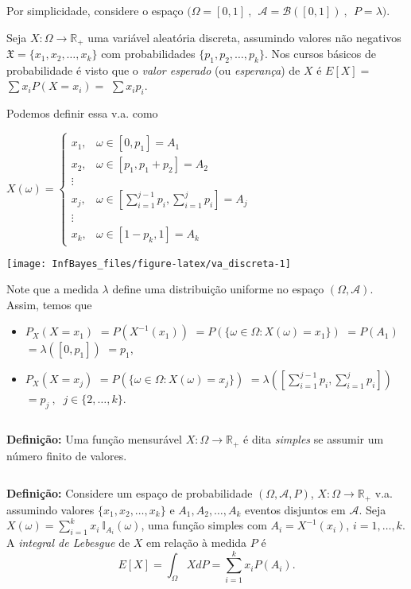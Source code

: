 \documentclass[
]{book}
\begin{document}
Por simplicidade, considere o espaço \(\Big(\Omega = [0,1]~,~~ \mathcal{A} = \mathcal{B}\left([0,1]\right)~,~~ P=\lambda\Big)\).

Seja \(X: \Omega \longrightarrow \mathbb{R}_+\) uma variável aleatória discreta, assumindo valores não negativos \(\mathfrak{X}=\{x_1,x_2,\ldots,x_k\}\) com probabilidades \(\{p_1,p_2,\ldots,p_k\}\). Nos cursos básicos de probabilidade é visto que o \emph{valor esperado} (ou \emph{esperança}) de \(X\) é \(E[X] =\) \(\sum x_i P(X=x_i) =\) \(\sum x_i p_i\).

Podemos definir essa v.a. como

\(X(\omega) = \left\{\begin{array}{ll} x_1, & \omega \in [0,p_1] = A_1 \\  x_2, & \omega \in [p_1,p_1+p_2] = A_2 \\  \vdots & \\  x_j, & \omega \in \left[\displaystyle\sum_{i=1}^{j-1} p_i,\sum_{i=1}^{j} p_i\right] = A_j \\  \vdots & \\  x_k, & \omega \in [1-p_k,1] = A_k \end{array}\right.\)

\begin{center}\texttt{[image: InfBayes\_files/figure-latex/va\_discreta-1]} \end{center}

Note que a medida \(\lambda\) define uma distribuição uniforme no espaço \((\Omega,\mathcal{A})\). Assim, temos que

\begin{itemize}
\item
  \(P_X(X=x_1)\) \(=P\left(X^{-1}(x_1)\right)\) \(=P\left(\{\omega \in \Omega : X(\omega)=x_1\}\right)\) \(=P(A_1)\) \(=\lambda\left([0,p_1]\right)\) \(=p_1\),
\item
  \(P_X(X=x_j)\) \(=P\left(\{\omega \in \Omega : X(\omega)=x_j\}\right)\) \(=\lambda\left(\left[\sum_{i=1}^{j-1} p_i,\sum_{i=1}^{j} p_i\right]\right)\) \(=p_j ~,~\) \(j \in \{2,\ldots,k\}\).
\end{itemize}

\(~\)

\textbf{Definição:} Uma função mensurável \(X: \Omega \longrightarrow \mathbb{R}_+\) é dita \emph{simples} se assumir um número finito de valores.

\(~\)

\textbf{Definição:} Considere um espaço de probabilidade \((\Omega, \mathcal{A}, P)\), \(X:\Omega\longrightarrow \mathbb{R}_+\) v.a. assumindo valores \(\{x_1,x_2,\ldots,x_k\}\) e \(A_1,A_2,\ldots,A_k\) eventos disjuntos em \(\mathcal{A}\). Seja \(\displaystyle X(\omega) = \sum_{i=1}^{k} x_i ~\mathbb{I}_{A_i}(\omega)\), uma função simples com \(A_i = X^{-1}(x_i)\), \(i=1,\ldots,k\). A \emph{integral de Lebesgue} de \(X\) em relação à medida \(P\) é
\[E[X] = \int_\Omega X dP = \sum_{i=1}^{k} x_i P(A_i).\]
\end{document}

